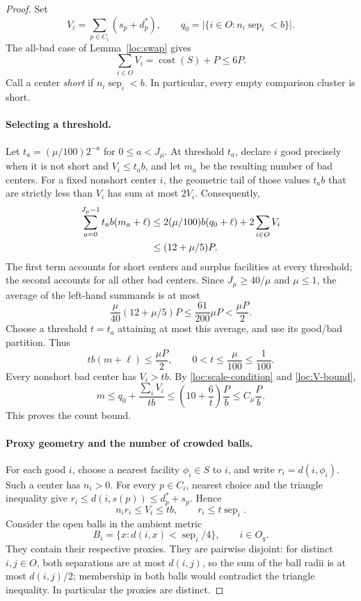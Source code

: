 \begin{proof}
Set
\[
 V_i=\sum_{p\in C_i}(s_p+d_p^*),\qquad
 q_0=\bigl|\{i\in O:n_i\operatorname{sep}_i<b\}\bigr|.
\]
The all-bad case of Lemma~\ref{loc:swap} gives
\begin{equation}
 \sum_{i\in O}V_i=\operatorname{cost}(S)+P\le6P.
 \label{loc:V-bound}
\end{equation}
Call a center \emph{short} if $n_i\operatorname{sep}_i<b$.  In particular,
every empty comparison cluster is short.

\paragraph{Selecting a threshold.}
Let $t_a=(\mu/100)2^{-a}$ for $0\le a<J_\mu$.  At threshold $t_a$, declare
$i$ good precisely when it is not short and $V_i\le t_ab$, and let
$m_a$ be the resulting number of bad centers.  For a fixed nonshort
center $i$, the geometric tail of those values $t_ab$ that are strictly
less than $V_i$ has sum at most $2V_i$.  Consequently,
\begin{align}
 \sum_{a=0}^{J_\mu-1}t_ab(m_a+\ell)
 &\le 2(\mu/100)b(q_0+\ell)+2\sum_{i\in O}V_i\notag\\
 &\le (12+\mu/5)P.
 \label{loc:threshold-average}
\end{align}
The first term accounts for short centers and surplus facilities at
every threshold; the second accounts for all other bad centers.
Since $J_\mu\ge40/\mu$ and $\mu\le1$, the average of the left-hand
summands is at most
\[
 \frac{\mu}{40}(12+\mu/5)P
 \le\frac{61}{200}\mu P<\frac{\mu P}{2}.
\]
Choose a threshold $t=t_a$ attaining at most this average, and use its
good/bad partition.  Thus
\begin{equation}
 tb(m+\ell)\le\frac{\mu P}{2},
 \qquad 0<t\le\frac{\mu}{100}\le\frac1{100}.
 \label{loc:selected-threshold}
\end{equation}
Every nonshort bad center has $V_i>tb$.  By
\eqref{loc:scale-condition} and \eqref{loc:V-bound},
\[
 m\le q_0+\frac{\sum_iV_i}{tb}
 \le\left(10+\frac6t\right)\frac Pb
 \le C_\mu\frac Pb.
\]
This proves the count bound.

\paragraph{Proxy geometry and the number of crowded balls.}
For each good $i$, choose a nearest facility $\phi_i\in S$ to $i$, and
write $r_i=d(i,\phi_i)$.  Such a center has $n_i>0$.  For every
$p\in C_i$, nearest choice and the triangle inequality give
$r_i\le d(i,s(p))\le d_p^*+s_p$.  Hence
\begin{equation}
 n_ir_i\le V_i\le tb,
 \qquad r_i\le t\operatorname{sep}_i.
 \label{loc:proxy-distance}
\end{equation}
Consider the open balls in the ambient metric
\[
 B_i=\{x:d(i,x)<\operatorname{sep}_i/4\},\qquad i\in O_g.
\]
They contain their respective proxies.  They are pairwise disjoint:
for distinct $i,j\in O$, both separations are at most $d(i,j)$, so
the sum of the ball radii is at most $d(i,j)/2$; membership in both
balls would contradict the triangle inequality.  In particular the
proxies are distinct.


\end{proof}
